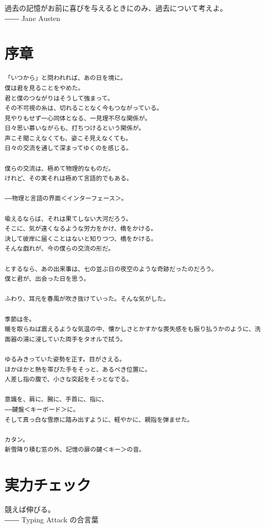 
\begin{screen}
過去の記憶がお前に喜びを与えるときにのみ、過去について考えよ。\\
―― Jane Austen
\end{screen}

\section*{序章}

\begin{verbatim}
「いつから」と問われれば、あの日を境に。
僕は君を見ることをやめた。
君と僕のつながりはそうして強まって。
その不可視の糸は、切れることなく今もつながっている。
見やりもせず一心同体となる、一見理不尽な関係が。
日々思い慕いながらも、打ちつけるという関係が。
声こそ聞こえなくても、姿こそ見えなくても。
日々の交流を通して深まってゆくのを感じる。

僕らの交流は、極めて物理的なものだ。
けれど、その実それは極めて言語的でもある。

――物理と言語の界面＜インターフェース＞。

喩えるならば、それは果てしない大河だろう。
そこに、気が遠くなるような労力をかけ、橋をかける。
決して彼岸に届くことはないと知りつつ、橋をかける。
そんな戯れが、今の僕らの交流の形だ。

とするなら、あの出来事は、七の並ぶ日の夜空のような奇跡だったのだろう。
僕と君が、出会った日を思う。

ふわり、耳元を春風が吹き抜けていった。そんな気がした。

季節は冬。
暖を取らねば震えるような気温の中、懐かしさとかすかな喪失感をも振り払うかのように、洗面器の湯に浸していた両手をタオルで拭う。

ゆるみきっていた姿勢を正す。目がさえる。
ほかほかと熱を帯びた手をそっと、あるべき位置に。
人差し指の腹で、小さな突起をそっとなでる。

意識を、肩に、腕に、手首に、指に、
――鍵盤＜キーボード＞に。
そして真っ白な雪原に踏み出すように、軽やかに、親指を弾ませた。

カタン。
新雪降り積む窓の外、記憶の扉の鍵＜キー＞の音。
\end{verbatim}

\section{実力チェック}
\begin{screen}
競えば伸びる。\\
―― Typing Attack の合言葉
\end{screen}

